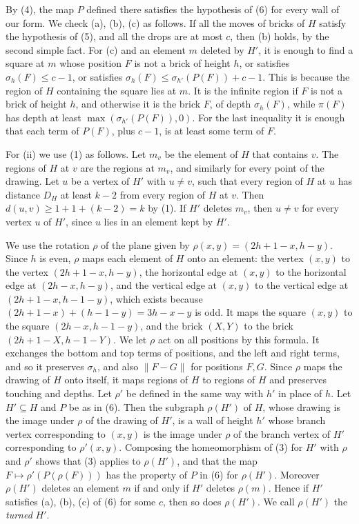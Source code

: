 {By (4), the map $P$ defined there satisfies the hypothesis of (6) for every wall of our form. We check (a), (b), (c) as follows. If all the moves of bricks of $H$ satisfy the hypothesis of (5), and all the drops are at most $c$, then (b) holds, by the second simple fact. For (c) and an element $m$ deleted by $H'$, it is enough to find a square at $m$ whose position $F$ is not a brick of height $h$, or satisfies $\sigma_h(F) \le c - 1$, or satisfies $\sigma_h(F) \le \sigma_{h'}(P(F)) + c - 1$. This is because the region of $H$ containing the square lies at $m$. It is the infinite region if $F$ is not a brick of height $h$, and otherwise it is the brick $F$, of depth $\sigma_h(F)$, while $\pi(F)$ has depth at least $\max(\sigma_{h'}(P(F)), 0)$. For the last inequality it is enough that each term of $P(F)$, plus $c - 1$, is at least some term of $F$.

For (ii) we use (1) as follows. Let $m_v$ be the element of $H$ that contains $v$. The regions of $H$ at $v$ are the regions at $m_v$, and similarly for every point of the drawing. Let $u$ be a vertex of $H'$ with $u \ne v$, such that every region of $H$ at $u$ has distance $D_H$ at least $k - 2$ from every region of $H$ at $v$. Then $d(u, v) \ge 1 + 1 + (k - 2) = k$ by (1). If $H'$ deletes $m_v$, then $u \ne v$ for every vertex $u$ of $H'$, since $u$ lies in an element kept by $H'$.

We use the rotation $\rho$ of the plane given by $\rho(x, y) = (2h + 1 - x, h - y)$. Since $h$ is even, $\rho$ maps each element of $H$ onto an element: the vertex $(x, y)$ to the vertex $(2h + 1 - x, h - y)$, the horizontal edge at $(x, y)$ to the horizontal edge at $(2h - x, h - y)$, and the vertical edge at $(x, y)$ to the vertical edge at $(2h + 1 - x, h - 1 - y)$, which exists because $(2h + 1 - x) + (h - 1 - y) = 3h - x - y$ is odd. It maps the square $(x, y)$ to the square $(2h - x, h - 1 - y)$, and the brick $(X, Y)$ to the brick $(2h + 1 - X, h - 1 - Y)$. We let $\rho$ act on all positions by this formula. It exchanges the bottom and top terms of positions, and the left and right terms, and so it preserves $\sigma_h$, and also $\|F - G\|$ for positions $F, G$. Since $\rho$ maps the drawing of $H$ onto itself, it maps regions of $H$ to regions of $H$ and preserves touching and depths. Let $\rho'$ be defined in the same way with $h'$ in place of $h$. Let $H' \subseteq H$ and $P$ be as in (6). Then the subgraph $\rho(H')$ of $H$, whose drawing is the image under $\rho$ of the drawing of $H'$, is a wall of height $h'$ whose branch vertex corresponding to $(x, y)$ is the image under $\rho$ of the branch vertex of $H'$ corresponding to $\rho'(x, y)$. Composing the homeomorphism of (3) for $H'$ with $\rho$ and $\rho'$ shows that (3) applies to $\rho(H')$, and that the map $F \mapsto \rho'(P(\rho(F)))$ has the property of $P$ in (6) for $\rho(H')$. Moreover $\rho(H')$ deletes an element $m$ if and only if $H'$ deletes $\rho(m)$. Hence if $H'$ satisfies (a), (b), (c) of (6) for some $c$, then so does $\rho(H')$. We call $\rho(H')$ the \textit{turned} $H'$.

}
